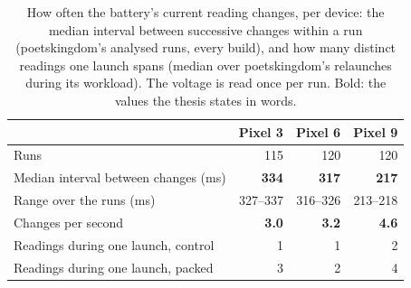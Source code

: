 \begin{table}[t]
\centering
\small
\caption{How often the battery's current reading changes, per device: the median interval between successive changes within a run (poetskingdom's analysed runs, every build), and how many distinct readings one launch spans (median over poetskingdom's relaunches during its workload). The voltage is read once per run. Bold: the values the thesis states in words.}
\label{tab:fuel-gauge}
\begin{tabular}{lrrr}
\toprule
\textbf{} & \textbf{Pixel 3} & \textbf{Pixel 6} & \textbf{Pixel 9} \\
\midrule
Runs & 115 & 120 & 120 \\
Median interval between changes (ms) & \textbf{334} & \textbf{317} & \textbf{217} \\
Range over the runs (ms) & 327–337 & 316–326 & 213–218 \\
Changes per second & \textbf{3.0} & \textbf{3.2} & \textbf{4.6} \\
Readings during one launch, control & 1 & 1 & 2 \\
Readings during one launch, packed & 3 & 2 & 4 \\
\bottomrule
\end{tabular}
\end{table}
